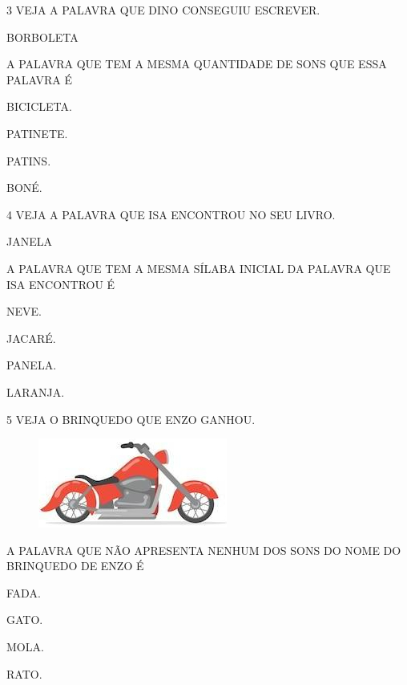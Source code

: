 \pagebreak
\num{3} VEJA A PALAVRA QUE DINO CONSEGUIU ESCREVER.

\begin{myquote}
BORBOLETA
\end{myquote}

A PALAVRA QUE TEM A MESMA QUANTIDADE DE SONS QUE ESSA PALAVRA É 

\begin{escolha}
\item BICICLETA.

\item PATINETE.

\item PATINS.

\item BONÉ.
\end{escolha}

\num{4} VEJA A PALAVRA QUE ISA ENCONTROU NO SEU LIVRO. 

\begin{myquote}
JANELA
\end{myquote}

A PALAVRA QUE TEM A MESMA SÍLABA INICIAL DA PALAVRA QUE ISA ENCONTROU É

\begin{escolha}
\item NEVE.

\item JACARÉ.

\item PANELA.

\item LARANJA.
\end{escolha}

\pagebreak
\num{5} VEJA O BRINQUEDO QUE ENZO GANHOU.

\begin{figure}[htpb]
\centering
\includegraphics[width=.3\textwidth]{media/image245.jpg}
\end{figure}


A PALAVRA QUE NÃO APRESENTA NENHUM DOS SONS DO NOME DO BRINQUEDO DE ENZO É

\begin{escolha}
\item FADA.

\item GATO.

\item MOLA.

\item RATO.
\end{escolha}

